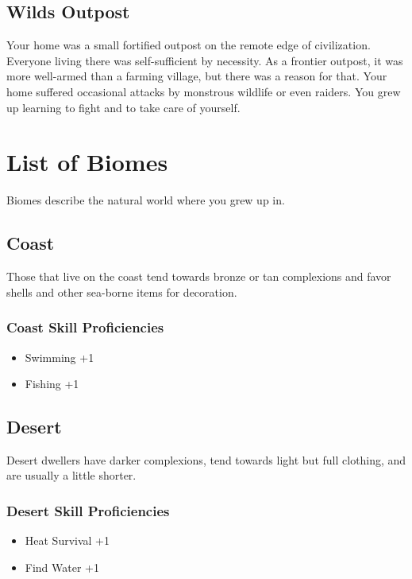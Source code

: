 \begin{multicols}{2}
\subsection{Wilds Outpost}

Your home was a small fortified outpost on the remote edge of civilization.
Everyone living there was self-sufficient by necessity. As a frontier
outpost, it was more well-armed than a farming village, but there was a
reason for that. Your home suffered occasional attacks by monstrous
wildlife or even raiders. You grew up learning to fight and to take
care of yourself.

\section{List of Biomes}

Biomes describe the natural world where you grew up in. 

\subsection{Coast}

Those that live on the coast tend towards bronze or tan complexions
and favor shells and other sea-borne items for decoration.

\subsubsection{Coast Skill Proficiencies}

\begin{itemize}
    \item Swimming +1
    \item Fishing +1
\end{itemize}

\subsection{Desert}

Desert dwellers have darker complexions, tend towards light but full
clothing, and are usually a little shorter.

\subsubsection{Desert Skill Proficiencies}

\begin{itemize}
    \item Heat Survival +1
    \item Find Water +1
\end{itemize}


\end{multicols}
